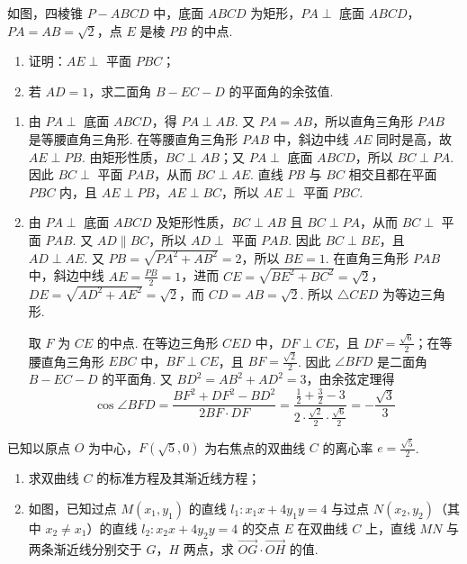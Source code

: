 \begin{problem}
如图，四棱锥 \(P - ABCD\) 中，底面 \(ABCD\) 为矩形，\(PA \perp\) 底面 \(ABCD\)，\(PA = AB = \sqrt{2}\)，点 \(E\) 是棱 \(PB\) 的中点.

\begin{enumerate}
\item 证明：\(AE \perp\) 平面 \(PBC\)；
\item 若 \(AD = 1\)，求二面角 \(B - EC - D\) 的平面角的余弦值.
\end{enumerate}

\end{problem}

\begin{solution}
\begin{enumerate}
\item 由 \(PA\perp\) 底面 \(ABCD\)，得 \(PA\perp AB\). 又 \(PA=AB\)，所以直角三角形 \(PAB\) 是等腰直角三角形. 在等腰直角三角形 \(PAB\) 中，斜边中线 \(AE\) 同时是高，故 \(AE\perp PB\). 由矩形性质，\(BC\perp AB\)；又 \(PA\perp\) 底面 \(ABCD\)，所以 \(BC\perp PA\). 因此 \(BC\perp\) 平面 \(PAB\)，从而 \(BC\perp AE\). 直线 \(PB\) 与 \(BC\) 相交且都在平面 \(PBC\) 内，且 \(AE\perp PB\)，\(AE\perp BC\)，所以 \(AE\perp\) 平面 \(PBC\).
\item 由 \(PA\perp\) 底面 \(ABCD\) 及矩形性质，\(BC\perp AB\) 且 \(BC\perp PA\)，从而 \(BC\perp\) 平面 \(PAB\). 又 \(AD\parallel BC\)，所以 \(AD\perp\) 平面 \(PAB\). 因此 \(BC\perp BE\)，且 \(AD\perp AE\). 又 \(PB=\sqrt{PA^2+AB^2}=2\)，所以 \(BE=1\). 在直角三角形 \(PAB\) 中，斜边中线 \(AE=\frac{PB}{2}=1\)，进而 \(CE=\sqrt{BE^2+BC^2}=\sqrt{2}\)，\(DE=\sqrt{AD^2+AE^2}=\sqrt{2}\)，而 \(CD=AB=\sqrt{2}\). 所以 \(\triangle CED\) 为等边三角形.

取 \(F\) 为 \(CE\) 的中点. 在等边三角形 \(CED\) 中，\(DF\perp CE\)，且 \(DF=\frac{\sqrt{6}}{2}\)；在等腰直角三角形 \(EBC\) 中，\(BF\perp CE\)，且 \(BF=\frac{\sqrt{2}}{2}\). 因此 \(\angle BFD\) 是二面角 \(B-EC-D\) 的平面角. 又 \(BD^2=AB^2+AD^2=3\)，由余弦定理得
\[
\cos\angle BFD=\frac{BF^2+DF^2-BD^2}{2BF\cdot DF}=\frac{\frac{1}{2}+\frac{3}{2}-3}{2\cdot\frac{\sqrt{2}}{2}\cdot\frac{\sqrt{6}}{2}}=-\frac{\sqrt{3}}{3}
\]
\end{enumerate}
\end{solution}

\begin{problem}
已知以原点 \(O\) 为中心，\(F(\sqrt{5}, 0)\) 为右焦点的双曲线 \(C\) 的离心率 \(e = \frac{\sqrt{5}}{2}\).

\begin{enumerate}
\item 求双曲线 \(C\) 的标准方程及其渐近线方程；
\item 如图，已知过点 \(M(x_1, y_1)\) 的直线 \(l_1: x_1x + 4y_1y = 4\) 与过点 \(N(x_2, y_2)\)（其中 \(x_2\ne x_1\)）的直线 \(l_2: x_2x + 4y_2y = 4\) 的交点 \(E\) 在双曲线 \(C\) 上，直线 \(MN\) 与两条渐近线分别交于 \(G\)，\(H\) 两点，求 \(\overrightarrow{OG} \cdot \overrightarrow{OH}\) 的值.
\end{enumerate}

\end{problem}

